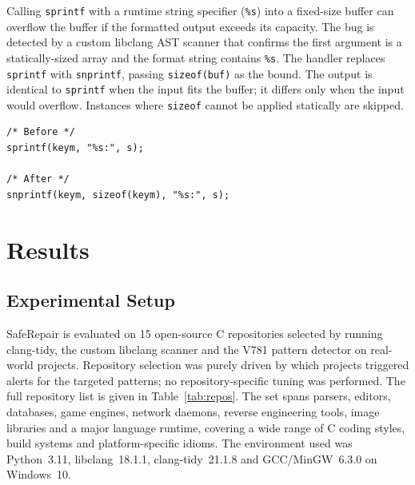 \documentclass[conference]{IEEEtran}
\begin{document}
Calling \texttt{sprintf} with a runtime string specifier (\texttt{\%s}) into a
fixed-size buffer can overflow the buffer if the formatted output exceeds its
capacity. The bug is detected by a custom libclang AST scanner that confirms the
first argument is a statically-sized array and the format string contains
\texttt{\%s}. The handler replaces \texttt{sprintf} with \texttt{snprintf},
passing \texttt{sizeof(buf)} as the bound. The output is identical to
\texttt{sprintf} when the input fits the buffer; it differs only when the input
would overflow. Instances where
\texttt{sizeof} cannot be applied statically are skipped.

\begin{lstlisting}[caption={CWE-120 fix: iniparser.c (taosdata/TDengine)}]
/* Before */
sprintf(keym, "%s:", s);

/* After */
snprintf(keym, sizeof(keym), "%s:", s);
\end{lstlisting}


\section{Results}

\subsection{Experimental Setup}
SafeRepair is evaluated on 15 open-source C repositories selected by running
clang-tidy, the custom libclang scanner and the V781 pattern detector on real-world
projects. Repository selection was purely driven by which projects triggered alerts
for the targeted patterns; no repository-specific tuning was performed. The full
repository list is given in Table~\ref{tab:repos}. The set spans parsers,
editors, databases, game engines, network daemons, reverse engineering tools,
image libraries and a major language runtime, covering a wide range of C coding
styles, build systems and platform-specific idioms. The environment used was
Python~3.11, libclang~18.1.1, clang-tidy~21.1.8 and GCC/MinGW~6.3.0 on
Windows~10.
\end{document}

